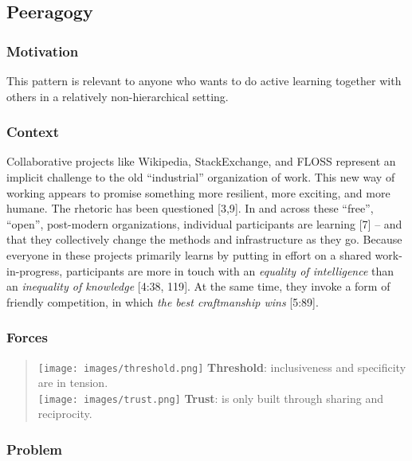 \hypertarget{peeragogy}{%
\subsection{Peeragogy}\label{peeragogy}}

\hypertarget{motivation}{%
\subsubsection{Motivation}\label{motivation}}

This pattern is relevant to anyone who wants to do active learning
together with others in a relatively non-hierarchical setting.

\hypertarget{context}{%
\subsubsection{Context}\label{context}}

Collaborative projects like Wikipedia, StackExchange, and FLOSS
represent an implicit challenge to the old ``industrial'' organization
of work. This new way of working appears to promise something more
resilient, more exciting, and more humane. The rhetoric has been
questioned {{[}3,9{]}}. In and across these ``free'', ``open'',
post-modern organizations, individual participants are learning
{{[}7{]}} -- and that they collectively change the methods and
infrastructure as they go. Because everyone in these projects primarily
learns by putting in effort on a shared work-in-progress, participants
are more in touch with an \emph{equality of intelligence} than an
\emph{inequality of knowledge} {{[}4:38, 119{]}}. At the same time, they
invoke a form of friendly competition, in which \emph{the best
craftmanship wins} {{[}5:89{]}}.

\hypertarget{forces}{%
\subsubsection{Forces}\label{forces}}

\begin{quote}
\texttt{[image: images/threshold.png]} \textbf{Threshold}: inclusiveness
and specificity are in tension.\\
\texttt{[image: images/trust.png]} \textbf{Trust}: is only built through
sharing and reciprocity.
\end{quote}

\hypertarget{problem}{%
\subsubsection{Problem}\label{problem}}

